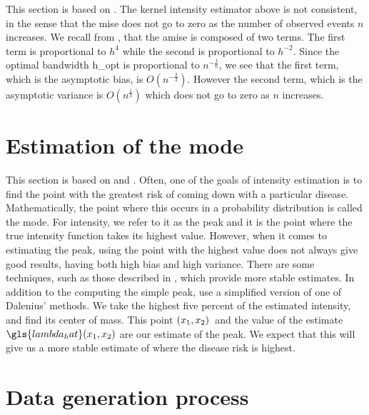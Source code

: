 This section is based on \citet{guan2008consistent}.
The \gls{kernel intensity estimator} above is not consistent,
in the sense that the \gls{mise} does not go to zero as the number of observed events $n$ increases.
We recall from ,
that the \gls{amise} is composed of two terms.
The first term is proportional to $h^4$ while the second is proportional to $h^{-2}$.
Since the optimal bandwidth \gls{h_opt} is proportional to $n^{-\frac{1}{6}}$,
we see that the first term,
which is the asymptotic bias,
is $O(n^{-\frac{2}{3}})$.
However the second term,
which is the asymptotic variance is $O(n^{\frac{1}{3}})$ which does not go to zero as $n$ increases.

\section{Estimation of the mode}
\label{sec:theory:mode}

This section is based on \citet{bickel2006fast} and \citet{hedges2003comparison}.
Often, one of the goals of intensity estimation is to find the point with the greatest \gls{risk} of coming down with a particular disease.
Mathematically, the point where this occurs in a probability distribution is called the mode.
For intensity, we refer to it as the peak and it is the point where the true intensity function takes its highest value.
However, when it comes to estimating the peak,
using the point with the highest value does not always give good results,
having both high bias and high variance.
There are some techniques, such as those described in \citep{dalenius1965mode},
which provide more stable estimates.
In addition to the computing the simple peak, use a simplified version of one of Dalenius' methods.
We take the highest five percent of the estimated intensity,
and find its center of mass.
This point $(x_1, x_2)$~and the value of the estimate $\gls{lambda_hat} \xvec$ are our estimate of the peak.
We expect that this will give us a more stable estimate of where the disease risk is highest.

\section{Data generation process}
\label{sec:theory:data}

